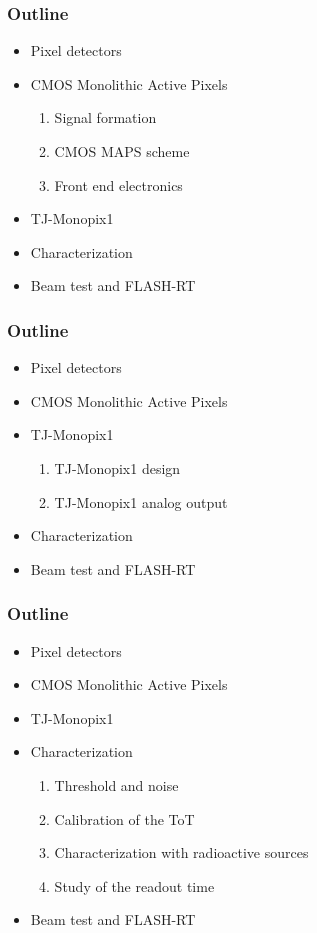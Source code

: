 \documentclass{beamer}
\begin{document}
\begin{frame}[noframenumbering]
    \frametitle{Outline}
    \begin{itemize}
        \item Pixel detectors 
        \item <alert@1> CMOS Monolithic Active Pixels 
        \begin{enumerate}
            \item Signal formation
            \item CMOS MAPS scheme
            \item Front end electronics
        \end{enumerate}
        \item TJ-Monopix1
        \item Characterization 
        \item Beam test and FLASH-RT
    \end{itemize}
\end{frame}



\begin{frame}[noframenumbering]
    \frametitle{Outline}
    \begin{itemize}
        \item Pixel detectors 
        \item CMOS Monolithic Active Pixels 
        \item <alert@1> TJ-Monopix1
        \begin{enumerate}
            \item TJ-Monopix1 design
            \item TJ-Monopix1 analog output
        \end{enumerate}        
        \item Characterization 
        \item Beam test and FLASH-RT
    \end{itemize}
\end{frame}


\begin{frame}[noframenumbering]
    \frametitle{Outline}
    \begin{itemize}
        \item Pixel detectors 
        \item CMOS Monolithic Active Pixels 
        \item TJ-Monopix1
        \item <alert@1> Characterization 
        \begin{enumerate}
            \item Threshold and noise
            \item Calibration of the ToT
            \item Characterization with radioactive sources
            \item Study of the readout time
        \end{enumerate}
        \item Beam test and FLASH-RT
    \end{itemize}
\end{frame}

\end{document}
